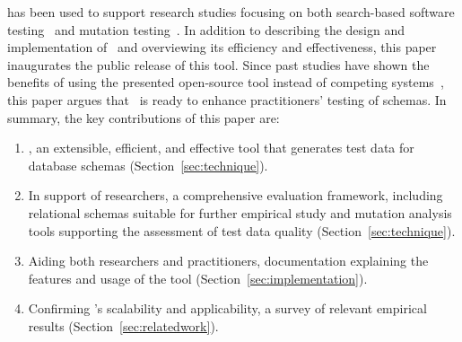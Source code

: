 
{\sa} has been used to support research studies focusing on both search-based software
testing~\cite{kapfhammer2013search,mcminn2015effectiveness,kinneer2015automatically} and mutation
testing~\cite{wright2013efficient,wright2014impact,wright2015mutation,mcminn2016virtual}.  In addition to describing the
design and implementation of \sa~and overviewing its efficiency and effectiveness, this paper inaugurates the public
release of this tool. Since past studies have shown the benefits of using the presented open-source tool instead
of competing systems~\cite{kapfhammer2013search}, this paper argues that \sa~is ready to enhance practitioners' testing
of schemas. In summary, the key contributions of this paper are:


\begin{enumerate}[labelindent=0pt]


  \item {\sa}, an extensible, efficient, and effective tool that generates test data for database schemas
    (Section~\ref{sec:technique}).


  \item In support of researchers, a comprehensive evaluation framework, including relational schemas suitable for
    further empirical study and mutation analysis tools supporting the assessment of test data quality
    (Section~\ref{sec:technique}).


  \item Aiding both researchers and practitioners, documentation explaining the features and usage of the tool
    (Section~\ref{sec:implementation}).


  \item Confirming \sa's scalability and applicability, a survey of relevant empirical results
    (Section~\ref{sec:relatedwork}).

\end{enumerate}

